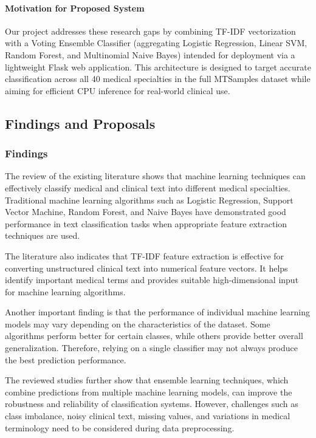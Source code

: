 \paragraph{Motivation for Proposed System}
Our project addresses these research gaps by combining TF-IDF vectorization with a Voting Ensemble Classifier (aggregating Logistic Regression, Linear SVM, Random Forest, and Multinomial Naive Bayes) intended for deployment via a lightweight Flask web application. This architecture is designed to target accurate classification across all 40 medical specialties in the full MTSamples dataset while aiming for efficient CPU inference for real-world clinical use.

\subsection{Findings and Proposals}

\subsubsection{Findings}
The review of the existing literature shows that machine learning techniques can effectively classify medical and clinical text into different medical specialties. Traditional machine learning algorithms such as Logistic Regression, Support Vector Machine, Random Forest, and Naive Bayes have demonstrated good performance in text classification tasks when appropriate feature extraction techniques are used.

The literature also indicates that TF-IDF feature extraction is effective for converting unstructured clinical text into numerical feature vectors. It helps identify important medical terms and provides suitable high-dimensional input for machine learning algorithms.

Another important finding is that the performance of individual machine learning models may vary depending on the characteristics of the dataset. Some algorithms perform better for certain classes, while others provide better overall generalization. Therefore, relying on a single classifier may not always produce the best prediction performance.

The reviewed studies further show that ensemble learning techniques, which combine predictions from multiple machine learning models, can improve the robustness and reliability of classification systems. However, challenges such as class imbalance, noisy clinical text, missing values, and variations in medical terminology need to be considered during data preprocessing.

